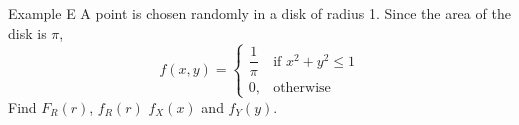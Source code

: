 \documentclass{beamer}
\begin{document}
\begin{frame}{Example E}
    A point is chosen randomly in a disk of radius 1. Since the area of the disk is \(\pi\), \[f(x,y)= \begin{cases}
        \dfrac{1}{\pi} & \text{if }x^2+y^2\leq 1\\
        0, & \text{otherwise}
    \end{cases}\] Find \(F_R(r)\), \(f_R(r)\)  \(f_X(x)\) and \(f_Y(y)\). 
\end{frame}
\end{document}
